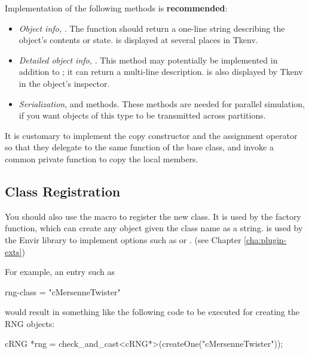 Implementation of the following methods is \textbf{recommended}:

\begin{itemize}
  \item{\textit{Object info,} . The  function
        should return a one-line string describing the object's contents or state.
         is displayed at several places in Tkenv.}
  \item{\textit{Detailed object info,} .
        This method may potentially be implemented in addition to ;
        it can return a multi-line description.  is also
        displayed by Tkenv in the object's inspector.}
  \item{\textit{Serialization},  and  methods.
        These methods are needed for parallel simulation, if you want
        objects of this type to be transmitted across partitions.}
\end{itemize}

It is customary to implement the copy constructor and the assignment operator
so that they delegate to the same function of the base class, and invoke a common
private  function to copy the local members.

\subsection{Class Registration}

You should also use the  macro to register the
new class. It is used by the  factory function, which can
create any object given the class name as a string. 
is used by the Envir library to implement  options
such as  or .
(see Chapter \ref{cha:plugin-exts})

For example, an  entry such as

\begin{inifile}
rng-class = "cMersenneTwister"
\end{inifile}

would result in something like the following code to be executed
for creating the RNG objects:

\begin{cpp}
cRNG *rng = check_and_cast<cRNG*>(createOne("cMersenneTwister"));
\end{cpp}

